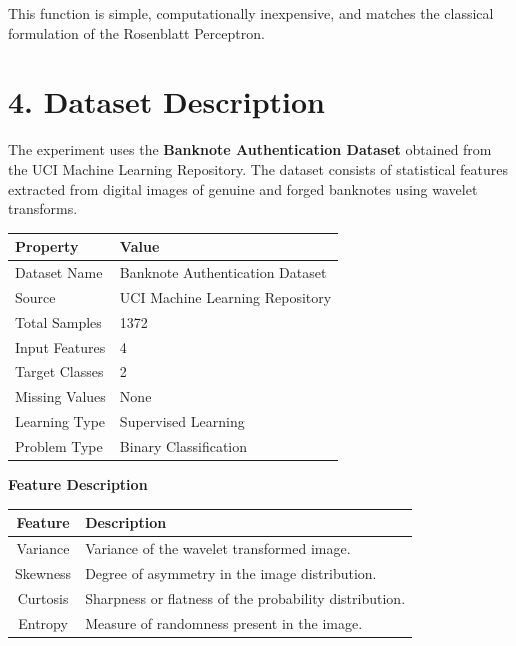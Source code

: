 \documentclass[11pt,a4paper]{article}
\begin{document}
This function is simple, computationally inexpensive, and matches the classical formulation of the Rosenblatt Perceptron.

\newpage
\section*{4. Dataset Description}

The experiment uses the \textbf{Banknote Authentication Dataset} obtained from the UCI Machine Learning Repository. The dataset consists of statistical features extracted from digital images of genuine and forged banknotes using wavelet transforms.

\vspace{0.3cm}

\begin{center}
\begin{tabular}{|p{5cm}|p{7cm}|}
\hline
\textbf{Property} & \textbf{Value}\\
\hline
Dataset Name & Banknote Authentication Dataset\\
\hline
Source & UCI Machine Learning Repository\\
\hline
Total Samples & 1372\\
\hline
Input Features & 4\\
\hline
Target Classes & 2\\
\hline
Missing Values & None\\
\hline
Learning Type & Supervised Learning\\
\hline
Problem Type & Binary Classification\\
\hline
\end{tabular}
\end{center}

\vspace{0.15cm}

\textbf{Feature Description}

\begin{center}
\begin{tabular}{|c|p{10cm}|}
\hline
\textbf{Feature} & \textbf{Description}\\
\hline
Variance & Variance of the wavelet transformed image.\\
\hline
Skewness & Degree of asymmetry in the image distribution.\\
\hline
Curtosis & Sharpness or flatness of the probability distribution.\\
\hline
Entropy & Measure of randomness present in the image.\\
\hline
\end{tabular}
\end{center}
\end{document}
